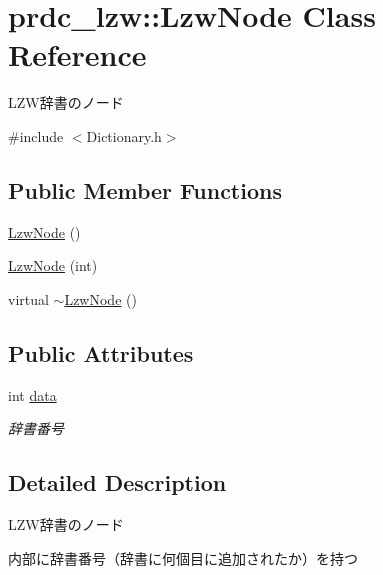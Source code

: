 \hypertarget{classprdc__lzw_1_1LzwNode}{\section{prdc\-\_\-lzw\-:\-:Lzw\-Node Class Reference}
\label{classprdc__lzw_1_1LzwNode}
}


L\-Z\-W辞書のノード  




{\ttfamily \#include $<$Dictionary.\-h$>$}

\subsection*{Public Member Functions}
\begin{DoxyCompactItemize}
\item 
\hyperlink{classprdc__lzw_1_1LzwNode_aecd8429cfcb52da0c5a88c2eb2ce8f17}{Lzw\-Node} ()
\item 
\hyperlink{classprdc__lzw_1_1LzwNode_a526085827e4c1f779a0bd7493c67c8c5}{Lzw\-Node} (int)
\item 
virtual \hyperlink{classprdc__lzw_1_1LzwNode_ab7c9e93839328025287d465734dfba4a}{$\sim$\-Lzw\-Node} ()
\end{DoxyCompactItemize}
\subsection*{Public Attributes}
\begin{DoxyCompactItemize}
\item 
int \hyperlink{classprdc__lzw_1_1LzwNode_ac85178681ea1181b22c3ac43af32515a}{data}
\begin{DoxyCompactList}\small\item\em 辞書番号 \end{DoxyCompactList}\end{DoxyCompactItemize}


\subsection{Detailed Description}
L\-Z\-W辞書のノード 

内部に辞書番号（辞書に何個目に追加されたか）を持つ 


